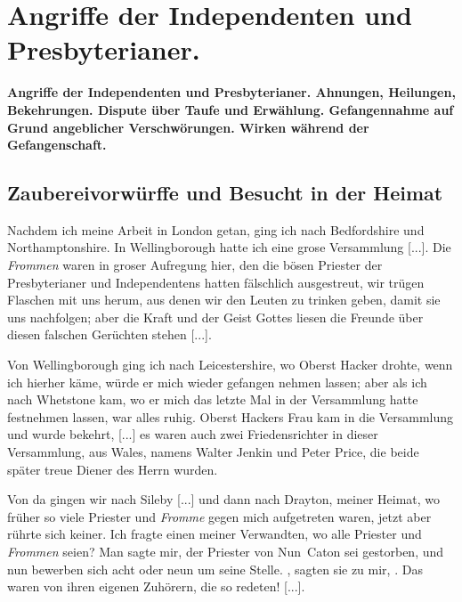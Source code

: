 


\chapter[Angriffe der Independenten und Presbyterianer.]{Angriffe der Independenten und Presbyterianer.}

\begin{center}
\textbf{Angriffe der Independenten und Presbyterianer. Ahnungen,
Heilungen, Bekehrungen. Dispute über Taufe und Erwählung.
Gefangennahme auf Grund angeblicher Verschwörungen. Wirken
während der Gefangenschaft.}
\end{center}

\section{Zaubereivorwürffe und Besucht in der Heimat}

Nachdem ich meine Arbeit in London getan, ging ich nach
Bedfordshire und
Northamptonshire. In 
Wellingborough hatte
ich eine grose Versammlung [...]. Die \textit{Frommen} waren in
groser Aufregung hier, den die bösen Priester der 
Presbyterianer und 
Independentens hatten fälschlich ausgestreut, 
wir trügen
Flaschen mit uns herum, aus denen wir den Leuten zu trinken
geben, damit sie uns nachfolgen; aber die Kraft und der Geist
Gottes liesen die Freunde über diesen falschen Gerüchten stehen [...].


Von Wellingborough ging ich nach Leicestershire, 
wo Oberst Hacker drohte, wenn ich hierher 
käme, würde er mich wieder gefangen nehmen lassen; aber als 
ich nach Whetstone kam, wo er
mich das letzte Mal in der Versammlung hatte festnehmen lassen,
war alles ruhig. Oberst Hackers Frau kam in die Versammlung 
und wurde bekehrt, [...] es waren auch zwei Friedensrichter 
in dieser Versammlung, aus Wales, namens Walter
Jenkin und Peter Price, 
die beide später treue Diener des Herrn wurden.

Von da gingen wir nach Sileby [...] und dann nach 
Drayton, meiner Heimat, wo früher so viele 
Priester und \textit{Fromme} gegen
mich aufgetreten waren, jetzt aber rührte sich keiner. Ich fragte
einen meiner Verwandten, wo alle Priester 
und \textit{Frommen} seien? Man sagte mir, der Priester von 
Nun~Caton sei gestorben, und nun bewerben 
sich acht oder neun um seine Stelle.
, sagten sie zu mir,
. Das waren von ihren
eigenen Zuhörern, die so redeten! [...].

